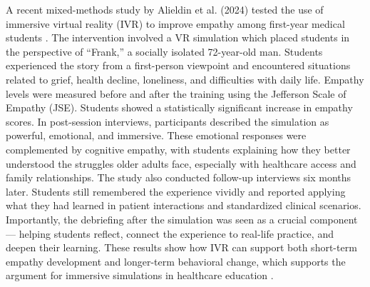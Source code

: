 \vspace{1em}

A recent mixed-methods study by Alieldin et al. (2024) tested the use of immersive virtual reality (IVR) to improve empathy among first-year medical students \cite{Alieldin2024}. The intervention involved a VR simulation which placed students in the perspective of “Frank,” a socially isolated 72-year-old man. Students experienced the story from a first-person viewpoint and encountered situations related to grief, health decline, loneliness, and difficulties with daily life. Empathy levels were measured before and after the training using the Jefferson Scale of Empathy (JSE). Students showed a statistically significant increase in empathy scores. In post-session interviews, participants described the simulation as powerful, emotional, and immersive. These emotional responses were complemented by cognitive empathy, with students explaining how they better understood the struggles older adults face, especially with healthcare access and family relationships. The study also conducted follow-up interviews six months later. Students still remembered the experience vividly and reported applying what they had learned in patient interactions and standardized clinical scenarios. Importantly, the debriefing after the simulation was seen as a crucial component — helping students reflect, connect the experience to real-life practice, and deepen their learning. These results show how IVR can support both short-term empathy development and longer-term behavioral change, which supports the argument for immersive simulations in healthcare education \cite{Alieldin2024}.


